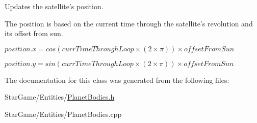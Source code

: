 Updates the satellite's position. 

\begin{DoxyVerb}       The position is based on the current time through the satellite's 
       revolution and its offset from sun.
\end{DoxyVerb}


$position.x = cos(currTimeThroughLoop \times (2 \times \pi)) \times offsetFromSun$

$position.y = sin(currTimeThroughLoop \times (2 \times \pi)) \times offsetFromSun$ 

The documentation for this class was generated from the following files\-:\begin{DoxyCompactItemize}
\item 
Star\-Game/\-Entities/\hyperlink{_planet_bodies_8h}{Planet\-Bodies.\-h}\item 
Star\-Game/\-Entities/Planet\-Bodies.\-cpp\end{DoxyCompactItemize}
